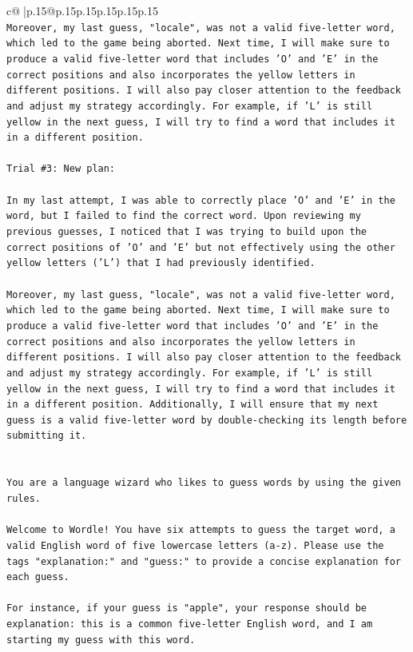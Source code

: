 \documentclass{article}
\begin{document}
{\begin{supertabular}{c@{$\;$}|p{.15\linewidth}@{}p{.15\linewidth}p{.15\linewidth}p{.15\linewidth}p{.15\linewidth}p{.15\linewidth}}
{{{\\ 
\texttt{Moreover, my last guess, "locale", was not a valid five{-}letter word, which led to the game being aborted. Next time, I will make sure to produce a valid five{-}letter word that includes 'O' and 'E' in the correct positions and also incorporates the yellow letters in different positions. I will also pay closer attention to the feedback and adjust my strategy accordingly. For example, if 'L' is still yellow in the next guess, I will try to find a word that includes it in a different position.} \\
\\ 
\texttt{Trial \#3: New plan: } \\
\\ 
\texttt{In my last attempt, I was able to correctly place 'O' and 'E' in the word, but I failed to find the correct word. Upon reviewing my previous guesses, I noticed that I was trying to build upon the correct positions of 'O' and 'E' but not effectively using the other yellow letters ('L') that I had previously identified. } \\
\\ 
\texttt{Moreover, my last guess, "locale", was not a valid five{-}letter word, which led to the game being aborted. Next time, I will make sure to produce a valid five{-}letter word that includes 'O' and 'E' in the correct positions and also incorporates the yellow letters in different positions. I will also pay closer attention to the feedback and adjust my strategy accordingly. For example, if 'L' is still yellow in the next guess, I will try to find a word that includes it in a different position. Additionally, I will ensure that my next guess is a valid five{-}letter word by double{-}checking its length before submitting it.} \\
\\ 
\\ 
\texttt{You are a language wizard who likes to guess words by using the given rules.} \\
\\ 
\texttt{Welcome to Wordle! You have six attempts to guess the target word, a valid English word of five lowercase letters (a{-}z). Please use the tags "explanation:" and "guess:" to provide a concise explanation for each guess.} \\
\\ 
\texttt{For instance, if your guess is "apple", your response should be} \\
\texttt{explanation: this is a common five{-}letter English word, and I am starting my guess with this word.} \\
}}}
\end{supertabular}}
\end{document}
